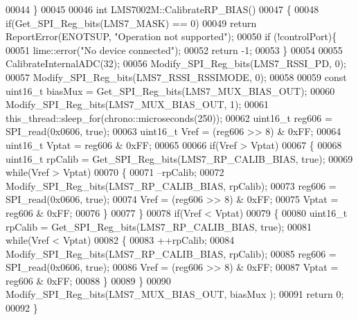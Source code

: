 \begin{DoxyCode}
00044 \}
00045 
00046 \textcolor{keywordtype}{int} LMS7002M::CalibrateRP\_BIAS()
00047 \{
00048     \textcolor{keywordflow}{if}(Get_SPI_Reg_bits(LMS7_MASK) == 0)
00049         \textcolor{keywordflow}{return} ReportError(ENOTSUP, \textcolor{stringliteral}{"Operation not supported"});
00050     \textcolor{keywordflow}{if} (!controlPort)\{
00051         lime::error(\textcolor{stringliteral}{"No device connected"});
00052         \textcolor{keywordflow}{return} -1;
00053     \}
00054 
00055     CalibrateInternalADC(32);
00056     Modify_SPI_Reg_bits(LMS7_RSSI_PD, 0);
00057     Modify_SPI_Reg_bits(LMS7_RSSI_RSSIMODE, 0);
00058 
00059     \textcolor{keyword}{const} uint16\_t biasMux = Get_SPI_Reg_bits(LMS7_MUX_BIAS_OUT);
00060     Modify_SPI_Reg_bits(LMS7_MUX_BIAS_OUT, 1);
00061     this\_thread::sleep\_for(chrono::microseconds(250));
00062     uint16\_t reg606 = SPI_read(0x0606, \textcolor{keyword}{true});
00063     uint16\_t Vref = (reg606 >> 8) & 0xFF;
00064     uint16\_t Vptat = reg606 & 0xFF;
00065 
00066     \textcolor{keywordflow}{if}(Vref > Vptat)
00067     \{
00068         uint16\_t rpCalib = Get_SPI_Reg_bits(LMS7_RP_CALIB_BIAS, \textcolor{keyword}{true});
00069         \textcolor{keywordflow}{while}(Vref > Vptat)
00070         \{
00071             --rpCalib;
00072             Modify_SPI_Reg_bits(LMS7_RP_CALIB_BIAS, rpCalib);
00073             reg606 = SPI_read(0x0606, \textcolor{keyword}{true});
00074             Vref = (reg606 >> 8) & 0xFF;
00075             Vptat = reg606 & 0xFF;
00076         \}
00077     \}
00078     \textcolor{keywordflow}{if}(Vref < Vptat)
00079     \{
00080         uint16\_t rpCalib = Get_SPI_Reg_bits(LMS7_RP_CALIB_BIAS, \textcolor{keyword}{true});
00081         \textcolor{keywordflow}{while}(Vref < Vptat)
00082         \{
00083             ++rpCalib;
00084             Modify_SPI_Reg_bits(LMS7_RP_CALIB_BIAS, rpCalib);
00085             reg606 = SPI_read(0x0606, \textcolor{keyword}{true});
00086             Vref = (reg606 >> 8) & 0xFF;
00087             Vptat = reg606 & 0xFF;
00088         \}
00089     \}
00090     Modify_SPI_Reg_bits(LMS7_MUX_BIAS_OUT, biasMux );
00091     \textcolor{keywordflow}{return} 0;
00092 \}
\end{DoxyCode}
